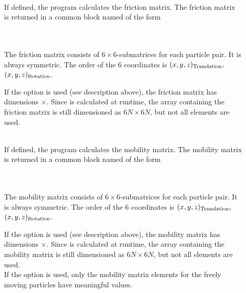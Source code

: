 \begin{description}
\item[]
\\
If defined, the program calculates the friction matrix. The friction
matrix is returned in a common block named  of the form\\
\wsp{}\\
\wsp{}\\
\begin{sloppy}
The friction matrix consists of $6\times 6$-submatrices for each particle
pair. It is always symmetric. The order of the 6 coordinates is
$(x,y,z)_{\rm Translation},$ $(x,y,z)_{\rm Rotation}$.\\
\end{sloppy}
If the option  is used (see description above), the friction
matrix has dimensions $\times$. Since
 is calculated at runtime, the array containing the friction
matrix is still dimensioned as $6N\times 6N$, but not all elements
are used.

\item[]
\\
If defined, the program calculates the mobility matrix. The mobility
matrix is returned in a common block named  of the form\\
\wsp{}\\
\wsp{}\\
\begin{sloppy}
The mobility matrix consists of $6\times 6$-submatrices for each particle
pair. It is always symmetric. The order of the 6 coordinates is
$(x,y,z)_{\rm Translation},$ $(x,y,z)_{\rm Rotation}$.\\
\end{sloppy}
If the option  is used (see description above), the mobility
matrix has dimensions $\times$. Since
 is calculated at runtime, the array containing the mobility
matrix is still dimensioned as $6N\times 6N$, but not all elements
are used.\\
If the option  is used, only the mobility matrix elements
for the freely moving particles have meaningful values.


\end{description}
